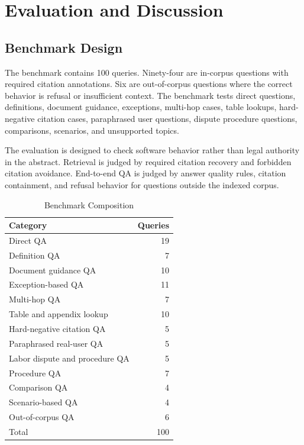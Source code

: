 \section{Evaluation and Discussion}

\subsection{Benchmark Design}
The benchmark contains 100 queries. Ninety-four are in-corpus questions with required citation annotations. Six are out-of-corpus questions where the correct behavior is refusal or insufficient context. The benchmark tests direct questions, definitions, document guidance, exceptions, multi-hop cases, table lookups, hard-negative citation cases, paraphrased user questions, dispute procedure questions, comparisons, scenarios, and unsupported topics.

The evaluation is designed to check software behavior rather than legal authority in the abstract. Retrieval is judged by required citation recovery and forbidden citation avoidance. End-to-end QA is judged by answer quality rules, citation containment, and refusal behavior for questions outside the indexed corpus.

\begin{table}[H]
  \centering
  \caption{Benchmark Composition}
  \label{tab:benchmark-composition-draft}
  \begin{tabular}{@{}lr@{}}
    \toprule
    Category & Queries \\
    \midrule
    Direct QA & 19 \\
    Definition QA & 7 \\
    Document guidance QA & 10 \\
    Exception-based QA & 11 \\
    Multi-hop QA & 7 \\
    Table and appendix lookup & 10 \\
    Hard-negative citation QA & 5 \\
    Paraphrased real-user QA & 5 \\
    Labor dispute and procedure QA & 5 \\
    Procedure QA & 7 \\
    Comparison QA & 4 \\
    Scenario-based QA & 4 \\
    Out-of-corpus QA & 6 \\
    \midrule
    Total & 100 \\
    \bottomrule
  \end{tabular}
\end{table}

